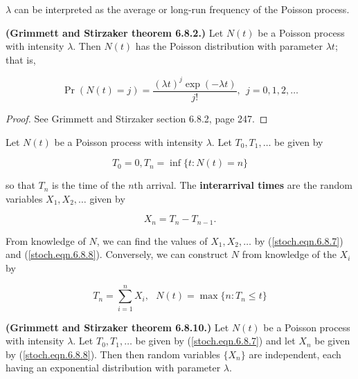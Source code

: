 \begin{remark}
\(\lambda\) can be interpreted as the average or long-run frequency of the Poisson process.
\end{remark}

\begin{theorem}\label{stoch.pois.proc.thm.6.8.2}\textbf{(Grimmett and Stirzaker theorem 6.8.2.)} Let \(N(t)\) be a Poisson process with intensity \(\lambda\). Then \(N(t)\) has the Poisson distribution with parameter \(\lambda t\); that is,

\[
\Pr(N(t) = j)  = \frac{(\lambda t)^j \exp(-\lambda t)}{j!}, \ \ j = 0, 1, 2, \ldots
\]
\end{theorem}

\begin{proof}See Grimmett and Stirzaker section 6.8.2, page 247. \end{proof}

\begin{definition}
Let \(N(t)\) be a Poisson process with intensity \(\lambda\). Let \(T_0, T_1, \ldots\) be given by

\begin{equation}\label{stoch.eqn.6.8.7}
T_0 = 0, T_n = \inf \{t: N(t) = n\}
\end{equation}

so that \(T_n\) is the time of the \(n\)th arrival. The \textbf{interarrival times} are the random variables \(X_1, X_2, \ldots\) given by

\begin{equation}\label{stoch.eqn.6.8.8}
X_n = T_n - T_{n-1}.
\end{equation}

\end{definition}

\begin{remark}
From knowledge of \(N\), we can find the values of \(X_1, X_2, \ldots\) by (\ref{stoch.eqn.6.8.7}) and (\ref{stoch.eqn.6.8.8}). Conversely, we can construct \(N\) from knowledge of the \(X_i\) by

\begin{equation}\label{stoch.eqn.6.8.9}
T_n = \sum_{i=1}^n X_i, \ \ \  N(t) = \max\{n: T_n \leq t\}
\end{equation}
\end{remark}

\begin{theorem}
\textbf{(Grimmett and Stirzaker theorem 6.8.10.)}\label{stoch.pois.proc.inter.thm} Let \(N(t)\) be a Poisson process with intensity \(\lambda\). Let \(T_0, T_1, \ldots\) be given by (\ref{stoch.eqn.6.8.7}) and let \(X_n\) be given by (\ref{stoch.eqn.6.8.8}). Then then random variables \(\{X_n\}\) are independent, each having an exponential distribution with parameter \(\lambda\).
\end{theorem}


